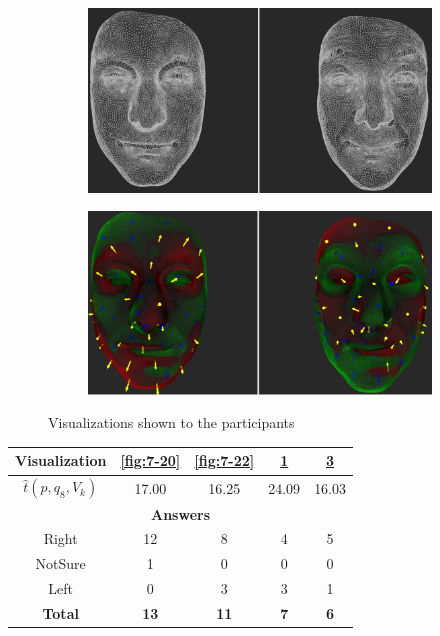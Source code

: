 \begin{figure}[h]
\begin{subfigure}{0.4\textwidth}
\includegraphics[width=\textwidth]{./screenshots/pair19.PNG}
\caption{}
\label{fig:7-19}
\end{subfigure}
\quad
\begin{subfigure}{0.4\textwidth}
\includegraphics[width=\textwidth]{./screenshots/pair21.PNG}
\caption{}
\label{fig:7-21}
\end{subfigure}
\caption{Visualizations shown to the participants}
\end{figure}
\medskip

\begin{center}
\begin{tabular}{| c | c | c | c | c |}
	\hline
	Visualization & \ref{fig:7-20} & \ref{fig:7-22} & \ref{fig:7-19} & \ref{fig:7-21}\\ \hline
	\(\widehat{t}(p, q_8, V_k)\) & 17.00 & 16.25 & 24.09 & 16.03\\ \hline
	\multicolumn{5}{|c|}{\bf Answers} \\ \hline
	Right & 12 & 8 & 4 & 5\\ \hline
	NotSure & 1 & 0 & 0 & 0\\ \hline
	Left & 0 & 3 & 3 & 1\\ \hline
	{\bf Total} & {\bf 13} & {\bf 11} & {\bf 7} & {\bf 6}\\ \hline
\end{tabular}
\end{center}
\clearpage

